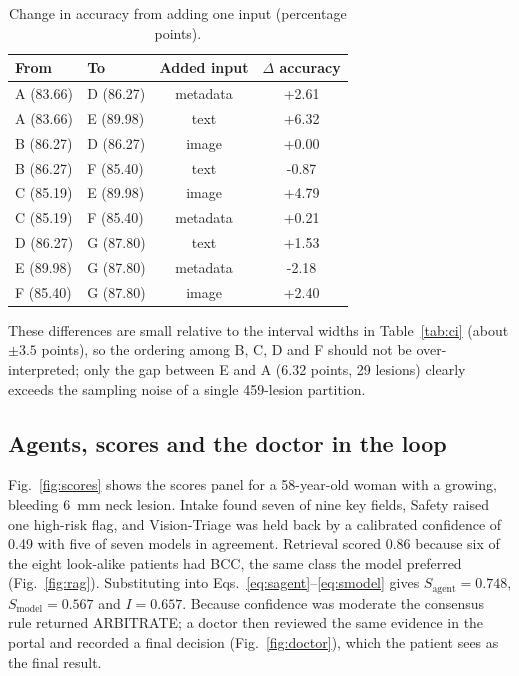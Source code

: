 \documentclass[conference]{IEEEtran}
\begin{document}
\begin{table}[!t]
\caption{Change in accuracy from adding one input (percentage points).}
\label{tab:gain}
\centering\footnotesize
\begin{tabular}{llcc}
\toprule
From & To & Added input & $\Delta$ accuracy \\
\midrule
A (83.66) & D (86.27) & metadata & +2.61 \\
A (83.66) & E (89.98) & text & +6.32 \\
B (86.27) & D (86.27) & image & +0.00 \\
B (86.27) & F (85.40) & text & -0.87 \\
C (85.19) & E (89.98) & image & +4.79 \\
C (85.19) & F (85.40) & metadata & +0.21 \\
D (86.27) & G (87.80) & text & +1.53 \\
E (89.98) & G (87.80) & metadata & -2.18 \\
F (85.40) & G (87.80) & image & +2.40 \\
\bottomrule
\end{tabular}
\end{table}


These differences are small relative to the interval widths in Table~\ref{tab:ci} (about $\pm3.5$ points), so the ordering among B, C, D and F should not be over-interpreted; only the gap between E and A (6.32 points, 29 lesions) clearly exceeds the sampling noise of a single 459-lesion partition.

\subsection{Agents, scores and the doctor in the loop}
Fig.~\ref{fig:scores} shows the scores panel for a 58-year-old woman with a growing, bleeding 6~mm neck lesion. Intake found seven of nine key fields, Safety raised one high-risk flag, and Vision-Triage was held back by a calibrated confidence of 0.49 with five of seven models in agreement. Retrieval scored 0.86 because six of the eight look-alike patients had BCC, the same class the model preferred (Fig.~\ref{fig:rag}). Substituting into Eqs.~\eqref{eq:sagent}--\eqref{eq:smodel} gives $S_{\mathrm{agent}}=0.748$, $S_{\mathrm{model}}=0.567$ and $I=0.657$. Because confidence was moderate the consensus rule returned ARBITRATE; a doctor then reviewed the same evidence in the portal and recorded a final decision (Fig.~\ref{fig:doctor}), which the patient sees as the final result.
\end{document}
